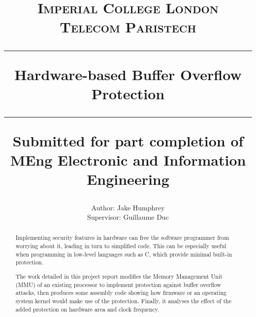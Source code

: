 \documentclass[11pt,a4paper,twoside,openany]{report}
\title{%
{\normalsize\scshape Imperial College London}\\
{\normalsize\scshape Telecom Paristech}\\
\vspace{2em}
\hrule
\vspace{1em}
{\huge\bfseries Hardware-based Buffer Overflow Protection}\\
\vspace{1em}
\hrule
\vspace{1em}
{\small Submitted for part completion of MEng Electronic and Information Engineering}
}
\author{%
Author: Jake Humphrey\\
Supervisor: Guillaume Duc
}
\date{}
\begin{document}

\pagestyle{empty}

\maketitle

\cleardoublepage
\begin{abstract}
Implementing security features in hardware can free the software programmer from worrying about it, leading in turn to simplified code. This can be especially useful when programming in low-level languages such as C, which provide minimal built-in protection.

The work detailed in this project report modifies the Memory Management Unit (MMU) of an existing processor to implement protection against buffer overflow attacks, then produces some assembly code showing how firmware or an operating system kernel would make use of the protection. Finally, it analyses the effect of the added protection on hardware area and clock frequency.

\end{abstract}

\cleardoublepage
\pagestyle{plain}
\setcounter{page}{1}
\tableofcontents

\newpage
\cleardoublepage
{}





\end{document}
